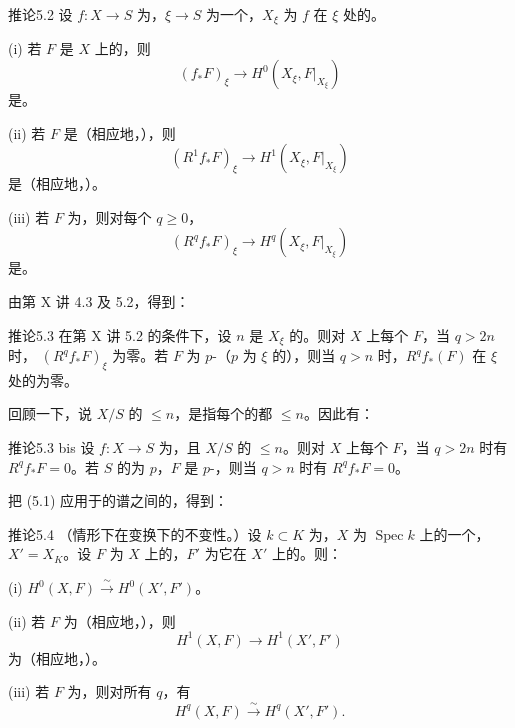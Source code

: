 \begin{SGAresult}{推论}{5.2}
设 $f:X\to S$ 为，$\xi\to S$ 为一个，$X_\xi$ 为 $f$ 在 $\xi$ 处的。

(i) 若 $F$ 是 $X$ 上的，则
\[
(f_*F)_\xi\longrightarrow H^0(X_\xi,F|_{X_\xi})
\]
是。

(ii) 若 $F$ 是（相应地，），则
\[
(R^1f_*F)_\xi\longrightarrow H^1(X_\xi,F|_{X_\xi})
\]
是（相应地，）。

(iii) 若 $F$ 为，则对每个 $q\geq0$，
\[
(R^qf_*F)_\xi\longrightarrow H^q(X_\xi,F|_{X_\xi})
\]
是。
\end{SGAresult}
由第 X 讲 4.3 及 5.2，得到：
\begin{SGAresult}{推论}{5.3}
在第 X 讲 5.2 的条件下，设 $n$ 是 $X_\xi$ 的。则对 $X$ 上每个 $F$，当 $q>2n$ 时， $(R^qf_*F)_\xi$ 为零。若 $F$ 为 $p$-（$p$ 为 $\xi$ 的），则当 $q>n$ 时，$R^qf_*(F)$ 在 $\xi$ 处的为零。
\end{SGAresult}
回顾一下，说 $X/S$ 的 $\leq n$，是指每个的都 $\leq n$。因此有：
\begin{SGAresult}{推论}{5.3 bis}
设 $f:X\to S$ 为，且 $X/S$ 的 $\leq n$。则对 $X$ 上每个 $F$，当 $q>2n$ 时有 $R^qf_*F=0$。若 $S$ 的为 $p$，$F$ 是 $p$-，则当 $q>n$ 时有 $R^qf_*F=0$。
\end{SGAresult}
把 (5.1) 应用于的谱之间的，得到：
\begin{SGAresult}{推论}{5.4}
（情形下在变换下的不变性。）设 $k\subset K$ 为，$X$ 为 $\operatorname{Spec}k$ 上的一个，$X'=X_K$。设 $F$ 为 $X$ 上的，$F'$ 为它在 $X'$ 上的。则：

(i) $H^0(X,F)\xrightarrow{\sim}H^0(X',F')$。

(ii) 若 $F$ 为（相应地，），则
\[
H^1(X,F)\longrightarrow H^1(X',F')
\]
为（相应地，）。

(iii) 若 $F$ 为，则对所有 $q$，有
\[
H^q(X,F)\xrightarrow{\sim}H^q(X',F').
\]
\end{SGAresult}

